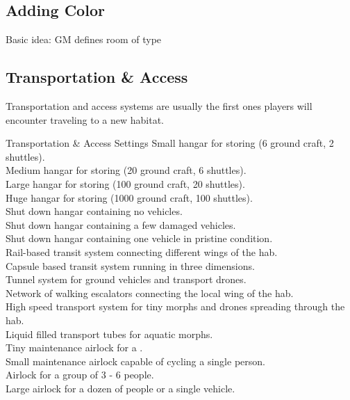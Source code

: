 
\begin{multicols}{2}

\section*{Adding Color}

Basic idea: GM defines room of type

\subsection*{Transportation \& Access}

Transportation and access systems are usually the first ones players will encounter
traveling to a new habitat.
\end{multicols}


\begin{tableone}{Transportation \& Access Settings}
Small hangar for storing (6 ground craft, 2 shuttles).\\
Medium hangar for storing (20 ground craft, 6 shuttles).\\
Large hangar for storing (100 ground craft, 20 shuttles).\\
Huge hangar for storing (1000 ground craft, 100 shuttles).\\
Shut down hangar containing no vehicles.\\
Shut down hangar containing a few damaged vehicles.\\
Shut down hangar containing one vehicle in pristine condition.\\
Rail-based transit system connecting different wings of the hab.\\
Capsule based transit system running in three dimensions.\\
Tunnel system for ground vehicles and transport drones.\\
Network of walking escalators connecting the local wing of the hab.\\
High speed transport system for tiny morphs and drones spreading through the hab.\\
Liquid filled transport tubes for aquatic morphs.\\
Tiny maintenance airlock for a .\\
Small maintenance airlock capable of cycling a single person.\\
Airlock for a group of 3 - 6 people.\\
Large airlock for a dozen of people or a single vehicle.\\

\end{tableone}
